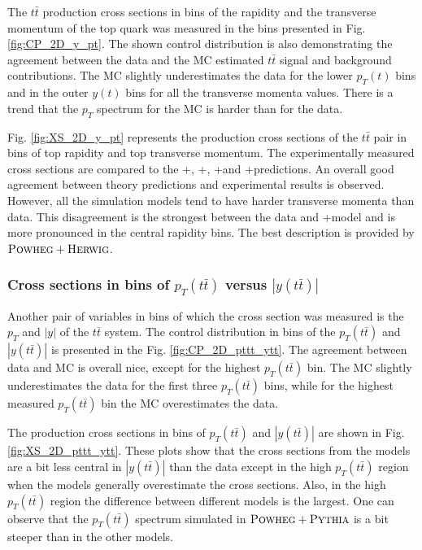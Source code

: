 The $t\bar{t}$ production cross sections in bins of the rapidity and the transverse momentum of the top quark was
measured in the bins presented in Fig. \ref{fig:CP_2D_y_pt}. The shown control distribution is also demonstrating the agreement between 
the data and the MC estimated $t\bar{t}$ signal and background contributions. The MC slightly underestimates the data for 
the lower $p_{T}(t)$ bins and in the outer $y(t)$ bins for all the transverse momenta values. There is a trend that the $p_{T}$
spectrum for the MC is harder than for the data.

Fig. \ref{fig:XS_2D_y_pt} represents the production cross sections of the $t\bar{t}$ pair in bins of top rapidity and top transverse momentum.
The experimentally measured cross sections are compared to the \MG+\PYTHIA, \Powheg+\PYTHIA, \Powheg+\HERWIG and \MCNLO+\HERWIG predictions.
An overall good agreement between theory predictions and experimental results is observed. However, all the simulation models tend to have 
harder transverse momenta than data. This disagreement is the strongest between the data and \MG+\PYTHIA model and is more pronounced in the 
central rapidity bins. The best description is provided by $\textsc{Powheg}+\textsc{Herwig}$.


\subsubsection{Cross sections in bins of $p_{T}(t\bar{t})$ versus $|y(t\bar{t})|$}

Another pair of variables in bins of which the cross section was measured is the $p_{T}$ and $|y|$ of the $t\bar{t}$ system. 
The control distribution in bins of the $p_{T}(t\bar{t})$ and $|y(t\bar{t})|$ is presented in the Fig. \ref{fig:CP_2D_pttt_ytt}. 
The agreement between data and MC is overall nice, except for the highest $p_{T}(t\bar{t})$ bin. The MC slightly underestimates 
the data for the first three $p_{T}(t\bar{t})$ bins, while for the highest measured $p_{T}(t\bar{t})$ bin the MC overestimates the data. 

The production cross sections in bins of $p_{T}(t\bar{t})$ and $|y(t\bar{t})|$ are shown in Fig. \ref{fig:XS_2D_pttt_ytt}.
These plots show that the cross sections from the models are a bit less central in $|y(t\bar{t})|$ than the data except in the 
high $p_{T}(t\bar{t})$ region when the models generally overestimate the cross sections. Also, in the high $p_{T}(t\bar{t})$
region the difference between different models is the largest. One can observe that the $p_{T}(t\bar{t})$ spectrum simulated
in $\textsc{Powheg}+\textsc{Pythia}$ is a bit steeper than in the other models.


